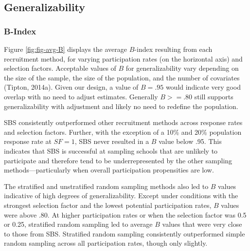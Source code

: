 \documentclass[
  man,floatsintext]{apa6}
\begin{document}
\hypertarget{generalizability-1}{%
\subsection*{Generalizability}\label{generalizability-1}}

\hypertarget{b-index}{%
\subsubsection*{B-Index}\label{b-index}}

Figure \ref{fig:fig-avg-B} displays the average \(B\)-index resulting from each recruitment method, for varying participation rates (on the horizontal axis) and selection factors. Acceptable values of \(B\) for generalizability vary depending on the size of the sample, the size of the population, and the number of covariates (Tipton, 2014a). Given our design, a value of \(B = .95\) would indicate very good overlap with no need to adjust estimates. Generally \(B >= .80\) still supports generalizability with adjustment and likely no need to redefine the population.

SBS consistently outperformed other recruitment methods across response rates and selection factors. Further, with the exception of a 10\% and 20\% population response rate at \(SF = 1\), SBS never resulted in a \(B\) value below .95. This indicates that SBS is successful at sampling schools that are unlikely to participate and therefore tend to be underrepresented by the other sampling methods---particularly when overall participation propensities are low.

The stratified and unstratified random sampling methods also led to \(B\) values indicative of high degrees of generalizability. Except under conditions with the strongest selection factor and the lowest potential participation rates, \(B\) values were above .80. At higher participation rates or when the selection factor was 0.5 or 0.25, stratified random sampling led to average \(B\) values that were very close to those from SBS. Stratified random sampling consistently outperformed simple random sampling across all participation rates, though only slightly.
\end{document}
